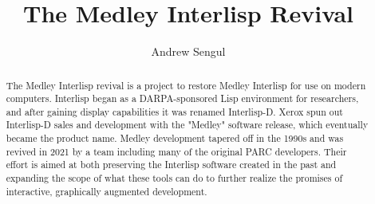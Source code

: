 \documentclass[sigconf]{acmart}
\begin{document}
\title{The Medley Interlisp Revival}


\author{Andrew Sengul}


\begin{abstract}
  The Medley Interlisp revival is a project to restore Medley Interlisp for use on modern computers. Interlisp began as a DARPA-sponsored Lisp environment for researchers, and after gaining display capabilities it was renamed Interlisp-D. Xerox spun out Interlisp-D sales and development with the "Medley" software release, which eventually became the product name. Medley development tapered off in the 1990s and was revived in 2021 by a team including many of the original PARC developers. Their effort is aimed at both preserving the Interlisp software created in the past and expanding the scope of what these tools can do to further realize the promises of interactive, graphically augmented development.
\end{abstract}

\begin{CCSXML}
\end{CCSXML}


\maketitle
\end{document}

